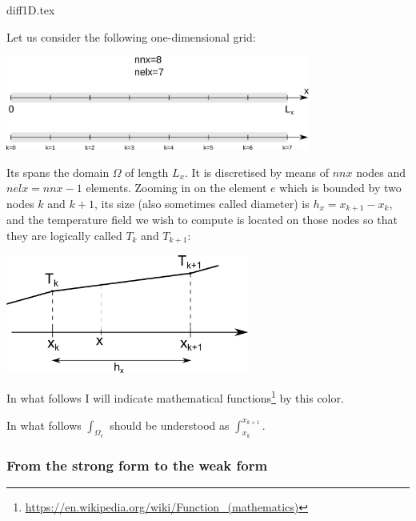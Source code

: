 \begin{flushright} {\tiny {\color{gray} diff1D.tex}} \end{flushright}

Let us consider the following one-dimensional grid: 
\begin{center}
\includegraphics[width=10cm]{images/oneD/domain}
\end{center}
Its spans the domain $\Omega$ of length $L_x$. 
It is discretised by means of 
$nnx$ nodes and $nelx=nnx-1$ elements.
Zooming in on the element $e$ which is bounded by two nodes $k$ and $k+1$,
its size (also sometimes called diameter) is $h_x=x_{k+1}-x_k$, 
and the temperature field we wish to compute is located on those 
nodes so that they are logically called $T_k$ and $T_{k+1}$:

\begin{center}
\includegraphics[width=8cm]{images/oneD/el1D}
\end{center}

\begin{remark}
In what follows I will indicate 
mathematical functions\footnote{\url{https://en.wikipedia.org/wiki/Function_(mathematics)}} 
by this {\color{Violet} color}.
\end{remark}

\begin{remark}
In what follows $\int_{\Omega_e}$ should be understood as $\int_{x_k}^{x_{k+1}}$.
\end{remark}


\subsubsection{From the strong form to the weak form}

